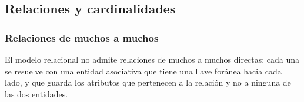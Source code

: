 \subsection*{Relaciones y cardinalidades}

\subsubsection*{Relaciones de muchos a muchos}

El modelo relacional no admite relaciones de muchos a muchos directas: cada una se resuelve con una entidad asociativa que tiene una llave foránea hacia cada lado, y que guarda los atributos que pertenecen a la relación y no a ninguna de las dos entidades.

